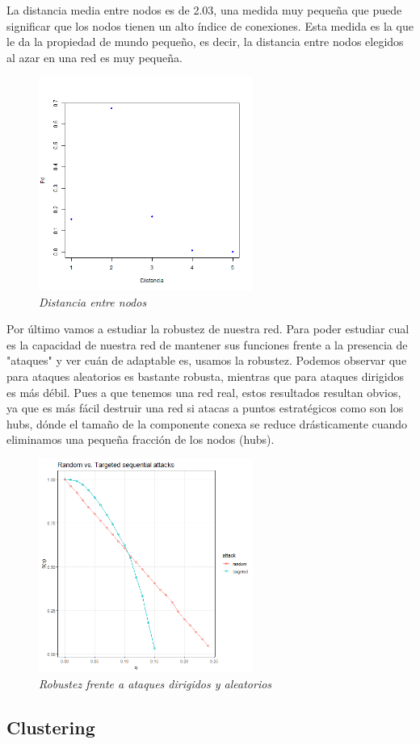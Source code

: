 La distancia media entre nodos es de 2.03, una medida muy pequeña que puede significar que los nodos tienen un alto índice de conexiones. Esta medida es la que le da la propiedad de mundo pequeño, es decir, la distancia entre nodos elegidos al azar en una red es muy pequeña. 
\begin{figure}
	\centering
	
	\includegraphics[width=70mm,scale=1.2]{figures/distancia.png}
	
	\caption{\textit{Distancia entre nodos}}
	
\end{figure}

Por último vamos a estudiar la robustez de nuestra red. Para poder estudiar cual es la capacidad de nuestra red de mantener sus funciones frente a la presencia de "ataques" y ver cuán de adaptable es, usamos la robustez. Podemos observar que para ataques aleatorios es bastante robusta, mientras que para ataques dirigidos es más débil. Pues a que tenemos una red real, estos resultados resultan obvios, ya que es más fácil destruir una red si atacas a puntos estratégicos como son los hubs, dónde el tamaño de la componente conexa se reduce drásticamente cuando eliminamos una pequeña fracción de los nodos (hubs). 

\begin{figure}
	\centering
	\includegraphics[width=70mm,scale=1.2]{figures/sequential_attacks.png}
	\caption{\textit{Robustez frente a ataques dirigidos y aleatorios}}
\end{figure}

\subsection{Clustering}



